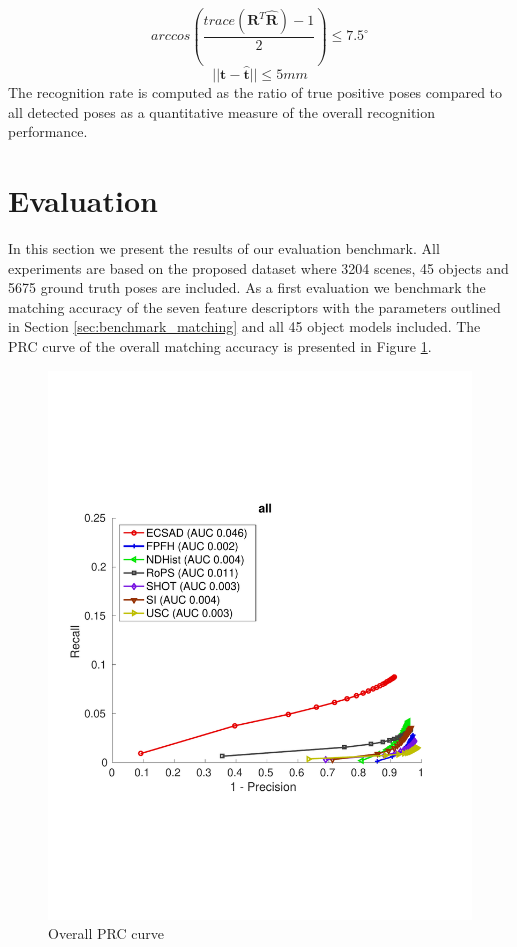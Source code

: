 \documentclass[10pt,twocolumn,letterpaper]{article}
\begin{document}
\begin{equation}\label{eq::rot}
arccos \left(\frac{trace(\textbf{R}^{T}\hat{\textbf{R}})-1}{2}\right) \leq 7.5^\circ
\end{equation}
\begin{equation}\label{eq::trans}
||\textbf{t} - \hat{\textbf{t}} || \leq 5mm
\end{equation}
The recognition rate is computed as the ratio of true positive poses compared to all detected poses as a quantitative measure of the overall recognition performance.
\section{Evaluation}\label{sec:evaluation}
In this section we present the results of our evaluation benchmark. All experiments are based on the proposed dataset where 3204 scenes, 45 objects and 5675 ground truth poses are included. As a first evaluation we benchmark the matching accuracy of the seven feature descriptors with the parameters outlined in Section \ref{sec:benchmark_matching} and all 45 object models included. The PRC curve of the overall matching accuracy is presented in Figure \ref{fig:all_L2_RATIO_zoom}.   
\begin{figure}[h]
\includegraphics[clip, trim=0.7cm 6cm 0.7cm 6cm,width=1.0\linewidth, height= 1.0\linewidth, keepaspectratio]{img/all_L2_RATIO_zoom.pdf} 
\caption{Overall PRC curve}\label{fig:all_L2_RATIO_zoom}
\end{figure}
\end{document}
